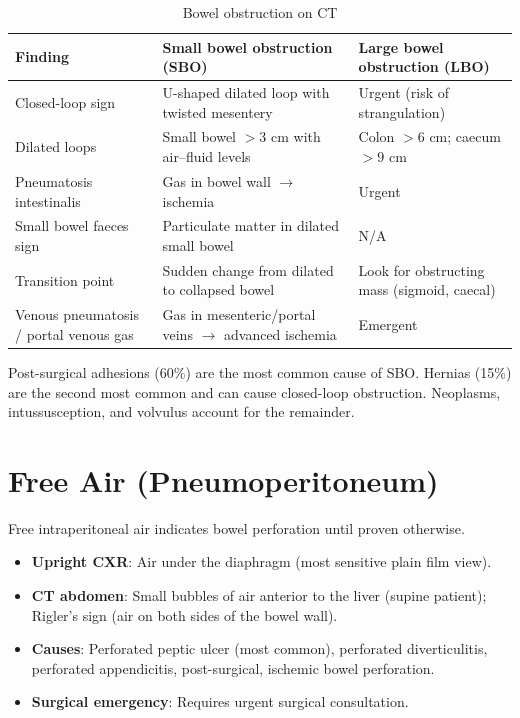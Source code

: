 \begin{table}[h]
\centering
\caption{Bowel obstruction on CT}
\begin{tabular}{p{3cm} p{4.5cm} p{4.5cm}}
\hline
\textbf{Finding} & \textbf{Small bowel obstruction (SBO)} & \textbf{Large bowel obstruction (LBO)} \\
\hline
Closed-loop sign & U-shaped dilated loop with twisted mesentery & Urgent (risk of strangulation) \\
Dilated loops & Small bowel $> 3$ cm with air--fluid levels & Colon $> 6$ cm; caecum $> 9$ cm \\
Pneumatosis intestinalis & Gas in bowel wall $\rightarrow$ ischemia & Urgent \\
Small bowel faeces sign & Particulate matter in dilated small bowel & N/A \\
Transition point & Sudden change from dilated to collapsed bowel & Look for obstructing mass (sigmoid, caecal) \\
Venous pneumatosis / portal venous gas & Gas in mesenteric/portal veins $\rightarrow$ advanced ischemia & Emergent \\
\hline
\end{tabular}
\end{table}

\begin{pearlbox}
Post-surgical adhesions (60\%) are the most common cause of SBO. Hernias (15\%) are the second most common and can cause closed-loop obstruction. Neoplasms, intussusception, and volvulus account for the remainder.
\end{pearlbox}


\section{Free Air (Pneumoperitoneum)}
Free intraperitoneal air indicates bowel perforation until proven otherwise.

\begin{itemize}
  \item \textbf{Upright CXR}: Air under the diaphragm (most sensitive plain film view).
  \item \textbf{CT abdomen}: Small bubbles of air anterior to the liver (supine patient); Rigler's sign (air on both sides of the bowel wall).
  \item \textbf{Causes}: Perforated peptic ulcer (most common), perforated diverticulitis, perforated appendicitis, post-surgical, ischemic bowel perforation.
  \item \textbf{Surgical emergency}: Requires urgent surgical consultation.
\end{itemize}


